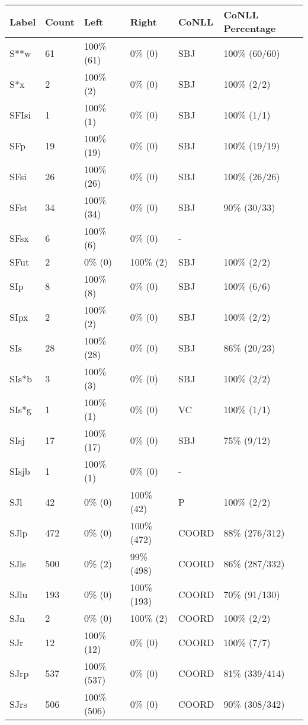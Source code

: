 \begin{figure*}
\begin{tabular}{|l|l|l|l||l|l|}
\hline
Label & Count & Left & Right & CoNLL & CoNLL Percentage\\ 
\hline
 S**w & 61 & 100\% (61) & 0\% (0) & SBJ & 100\% (60/60) \\ 
\hline
 S*x & 2 & 100\% (2) & 0\% (0) & SBJ & 100\% (2/2) \\ 
\hline
 SFIsi & 1 & 100\% (1) & 0\% (0) & SBJ & 100\% (1/1) \\ 
\hline
 SFp & 19 & 100\% (19) & 0\% (0) & SBJ & 100\% (19/19) \\ 
\hline
 SFsi & 26 & 100\% (26) & 0\% (0) & SBJ & 100\% (26/26) \\ 
\hline
 SFst & 34 & 100\% (34) & 0\% (0) & SBJ & 90\% (30/33) \\ 
\hline
 SFsx & 6 & 100\% (6) & 0\% (0) & - &  \\ 
\hline
 SFut & 2 & 0\% (0) & 100\% (2) & SBJ & 100\% (2/2) \\ 
\hline
 SIp & 8 & 100\% (8) & 0\% (0) & SBJ & 100\% (6/6) \\ 
\hline
 SIpx & 2 & 100\% (2) & 0\% (0) & SBJ & 100\% (2/2) \\ 
\hline
 SIs & 28 & 100\% (28) & 0\% (0) & SBJ & 86\% (20/23) \\ 
\hline
 SIs*b & 3 & 100\% (3) & 0\% (0) & SBJ & 100\% (2/2) \\ 
\hline
 SIs*g & 1 & 100\% (1) & 0\% (0) & VC & 100\% (1/1) \\ 
\hline
 SIsj & 17 & 100\% (17) & 0\% (0) & SBJ & 75\% (9/12) \\ 
\hline
 SIsjb & 1 & 100\% (1) & 0\% (0) & - &  \\ 
\hline
 SJl & 42 & 0\% (0) & 100\% (42) & P & 100\% (2/2) \\ 
\hline
 SJlp & 472 & 0\% (0) & 100\% (472) & COORD & 88\% (276/312) \\ 
\hline
 SJls & 500 & 0\% (2) & 99\% (498) & COORD & 86\% (287/332) \\ 
\hline
 SJlu & 193 & 0\% (0) & 100\% (193) & COORD & 70\% (91/130) \\ 
\hline
 SJn & 2 & 0\% (0) & 100\% (2) & COORD & 100\% (2/2) \\ 
\hline
 SJr & 12 & 100\% (12) & 0\% (0) & COORD & 100\% (7/7) \\ 
\hline
 SJrp & 537 & 100\% (537) & 0\% (0) & COORD & 81\% (339/414) \\ 
\hline
 SJrs & 506 & 100\% (506) & 0\% (0) & COORD & 90\% (308/342) \\ 

\end{tabular}
\end{figure*}
